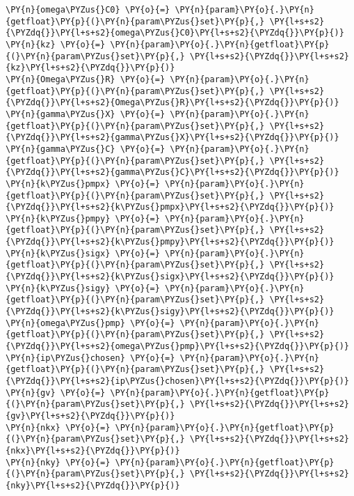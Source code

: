 \begin{Verbatim}[commandchars=\\\{\}]
\PY{n}{omega\PYZus{}C0} \PY{o}{=} \PY{n}{param}\PY{o}{.}\PY{n}{getfloat}\PY{p}{(}\PY{n}{param\PYZus{}set}\PY{p}{,} \PY{l+s+s2}{\PYZdq{}}\PY{l+s+s2}{omega\PYZus{}C0}\PY{l+s+s2}{\PYZdq{}}\PY{p}{)}
\PY{n}{kz} \PY{o}{=} \PY{n}{param}\PY{o}{.}\PY{n}{getfloat}\PY{p}{(}\PY{n}{param\PYZus{}set}\PY{p}{,} \PY{l+s+s2}{\PYZdq{}}\PY{l+s+s2}{kz}\PY{l+s+s2}{\PYZdq{}}\PY{p}{)}
\PY{n}{Omega\PYZus{}R} \PY{o}{=} \PY{n}{param}\PY{o}{.}\PY{n}{getfloat}\PY{p}{(}\PY{n}{param\PYZus{}set}\PY{p}{,} \PY{l+s+s2}{\PYZdq{}}\PY{l+s+s2}{Omega\PYZus{}R}\PY{l+s+s2}{\PYZdq{}}\PY{p}{)}
\PY{n}{gamma\PYZus{}X} \PY{o}{=} \PY{n}{param}\PY{o}{.}\PY{n}{getfloat}\PY{p}{(}\PY{n}{param\PYZus{}set}\PY{p}{,} \PY{l+s+s2}{\PYZdq{}}\PY{l+s+s2}{gamma\PYZus{}X}\PY{l+s+s2}{\PYZdq{}}\PY{p}{)}
\PY{n}{gamma\PYZus{}C} \PY{o}{=} \PY{n}{param}\PY{o}{.}\PY{n}{getfloat}\PY{p}{(}\PY{n}{param\PYZus{}set}\PY{p}{,} \PY{l+s+s2}{\PYZdq{}}\PY{l+s+s2}{gamma\PYZus{}C}\PY{l+s+s2}{\PYZdq{}}\PY{p}{)}
\PY{n}{k\PYZus{}pmpx} \PY{o}{=} \PY{n}{param}\PY{o}{.}\PY{n}{getfloat}\PY{p}{(}\PY{n}{param\PYZus{}set}\PY{p}{,} \PY{l+s+s2}{\PYZdq{}}\PY{l+s+s2}{k\PYZus{}pmpx}\PY{l+s+s2}{\PYZdq{}}\PY{p}{)}
\PY{n}{k\PYZus{}pmpy} \PY{o}{=} \PY{n}{param}\PY{o}{.}\PY{n}{getfloat}\PY{p}{(}\PY{n}{param\PYZus{}set}\PY{p}{,} \PY{l+s+s2}{\PYZdq{}}\PY{l+s+s2}{k\PYZus{}pmpy}\PY{l+s+s2}{\PYZdq{}}\PY{p}{)}
\PY{n}{k\PYZus{}sigx} \PY{o}{=} \PY{n}{param}\PY{o}{.}\PY{n}{getfloat}\PY{p}{(}\PY{n}{param\PYZus{}set}\PY{p}{,} \PY{l+s+s2}{\PYZdq{}}\PY{l+s+s2}{k\PYZus{}sigx}\PY{l+s+s2}{\PYZdq{}}\PY{p}{)}
\PY{n}{k\PYZus{}sigy} \PY{o}{=} \PY{n}{param}\PY{o}{.}\PY{n}{getfloat}\PY{p}{(}\PY{n}{param\PYZus{}set}\PY{p}{,} \PY{l+s+s2}{\PYZdq{}}\PY{l+s+s2}{k\PYZus{}sigy}\PY{l+s+s2}{\PYZdq{}}\PY{p}{)}
\PY{n}{omega\PYZus{}pmp} \PY{o}{=} \PY{n}{param}\PY{o}{.}\PY{n}{getfloat}\PY{p}{(}\PY{n}{param\PYZus{}set}\PY{p}{,} \PY{l+s+s2}{\PYZdq{}}\PY{l+s+s2}{omega\PYZus{}pmp}\PY{l+s+s2}{\PYZdq{}}\PY{p}{)}
\PY{n}{ip\PYZus{}chosen} \PY{o}{=} \PY{n}{param}\PY{o}{.}\PY{n}{getfloat}\PY{p}{(}\PY{n}{param\PYZus{}set}\PY{p}{,} \PY{l+s+s2}{\PYZdq{}}\PY{l+s+s2}{ip\PYZus{}chosen}\PY{l+s+s2}{\PYZdq{}}\PY{p}{)}
\PY{n}{gv} \PY{o}{=} \PY{n}{param}\PY{o}{.}\PY{n}{getfloat}\PY{p}{(}\PY{n}{param\PYZus{}set}\PY{p}{,} \PY{l+s+s2}{\PYZdq{}}\PY{l+s+s2}{gv}\PY{l+s+s2}{\PYZdq{}}\PY{p}{)}
\PY{n}{nkx} \PY{o}{=} \PY{n}{param}\PY{o}{.}\PY{n}{getfloat}\PY{p}{(}\PY{n}{param\PYZus{}set}\PY{p}{,} \PY{l+s+s2}{\PYZdq{}}\PY{l+s+s2}{nkx}\PY{l+s+s2}{\PYZdq{}}\PY{p}{)}
\PY{n}{nky} \PY{o}{=} \PY{n}{param}\PY{o}{.}\PY{n}{getfloat}\PY{p}{(}\PY{n}{param\PYZus{}set}\PY{p}{,} \PY{l+s+s2}{\PYZdq{}}\PY{l+s+s2}{nky}\PY{l+s+s2}{\PYZdq{}}\PY{p}{)}

\end{Verbatim}
